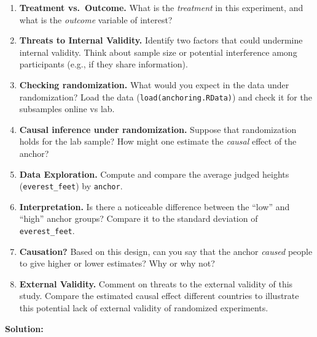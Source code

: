 \documentclass[12pt]{article}
\begin{document}
\begin{enumerate}
  \item \textbf{Treatment vs.\ Outcome.} What is the \emph{treatment} in this experiment, and what is the \emph{outcome} variable of interest?
  \item \textbf{Threats to Internal Validity.} Identify two factors that could undermine internal validity. Think about sample size or potential interference among participants (e.g., if they share information).
  \item \textbf{Checking randomization.} What would you expect in the data under randomization? Load the data (\texttt{load(anchoring.RData)}) and check it for the subsamples online vs lab.
  \item \textbf{Causal inference under randomization.} Suppose that randomization holds for the lab sample? How might one estimate the \emph{causal} effect of the anchor?
  \item \textbf{Data Exploration.} Compute and compare the average judged heights (\texttt{everest\_feet}) by \texttt{anchor}.
  \item \textbf{Interpretation.} Is there a noticeable difference between the “low” and “high” anchor groups? Compare it to the standard deviation of \texttt{everest\_feet}.
  \item \textbf{Causation?} Based on this design, can you say that the anchor \emph{caused} people to give higher or lower estimates? Why or why not?
  \item \textbf{External Validity.} Comment on threats to the external validity of this study. Compare the estimated causal effect different countries to illustrate this potential lack of external validity of randomized experiments. 
\end{enumerate}

\noindent \textbf{Solution:}
\end{document}
